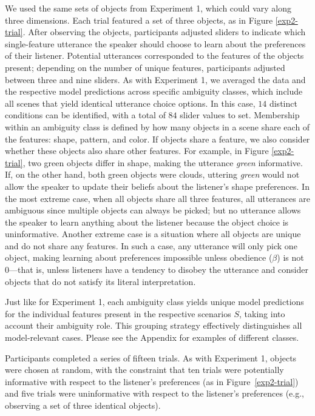 \documentclass[11pt,a4paper]{article}
\begin{document}
We used the same sets of objects from Experiment 1, which could vary along three dimensions. Each trial featured a set of three objects, as in Figure \ref{exp2-trial}. After observing the objects, participants adjusted sliders to indicate which single-feature utterance the speaker should choose to learn about the preferences of their listener. Potential utterances corresponded to the features of the objects present; depending on the number of unique features, participants adjusted between three and nine sliders. As with Experiment 1, we averaged the data and the respective model predictions across specific ambiguity classes, which include all scenes that yield identical utterance choice options. 
In this case, $14$ distinct conditions can be identified, with a total of $84$ slider values to set. 
Membership within an ambiguity class is defined by how many objects in a scene share each of the features: shape, pattern, and color. If objects share a feature, we also consider whether these objects also share other features. For example, in Figure \ref{exp2-trial}, two green objects differ in shape, making the utterance \textit{green} informative. If, on the other hand, both green objects were clouds, uttering \textit{green} would not allow the speaker to update their beliefs about the listener's shape preferences.
In the most extreme case, when all objects share all three features, all utterances are ambiguous since multiple objects can always be picked; but no utterance allows the speaker to learn anything about the listener because the object choice is uninformative. Another extreme case is a situation where all objects are unique and do not share any features. In such a case, any utterance will only pick one object, making learning about preferences impossible unless obedience ($\beta$) is not 0---that is, unless listeners have a tendency to disobey the utterance and consider objects that do not satisfy its literal interpretation.

Just like for Experiment 1, each ambiguity class yields unique model predictions for the individual features present in the respective scenarios $S$, taking into account their ambiguity role. This grouping strategy effectively distinguishes all model-relevant cases. Please see the Appendix for examples of different classes.


Participants completed a series of fifteen trials. As with Experiment 1, objects were chosen at random, with the constraint that ten trials were potentially informative with respect to the listener's preferences (as in Figure~\ref{exp2-trial}) and five trials were uninformative with respect to the listener's preferences (e.g., observing a set of three identical objects).
\end{document}
